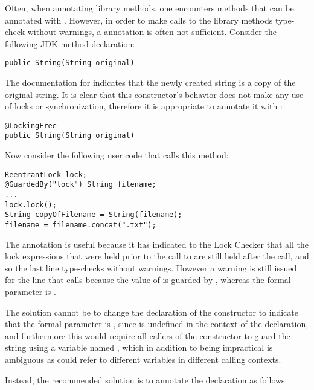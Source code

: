 Often, when annotating library methods, one encounters methods that can
be annotated with .  However, in order to make calls
to the library methods type-check without warnings, a 
annotation is often not sufficient.  Consider the following JDK method declaration:

\begin{verbatim}
public String(String original)
\end{verbatim}

The documentation for 
indicates that the newly created string is a copy of the original string.
It is clear that this constructor's behavior does not make any use of
locks or synchronization, therefore it is appropriate to annotate it
with :

\begin{verbatim}
@LockingFree
public String(String original)
\end{verbatim}

Now consider the following user code that calls this method:

\begin{verbatim}
ReentrantLock lock;
@GuardedBy("lock") String filename;
...
lock.lock();
String copyOfFilename = String(filename);
filename = filename.concat(".txt");
\end{verbatim}

The  annotation is useful because it has indicated to the
Lock Checker that all the lock expressions that were held prior to the
call to  are still held after the call, and so the
last line type-checks without warnings.  However a warning is still issued
for the line that calls  because the value of
 is guarded by , whereas the formal parameter
 is .

The solution cannot be to change the declaration of the constructor to
indicate that the formal parameter is , since
 is undefined in the context of the declaration, and furthermore
this would require all callers of the constructor to guard the string
using a variable named , which in addition to being impractical
is ambiguous as  could refer to different variables in different
calling contexts.

Instead, the recommended solution is to annotate the declaration as follows:

